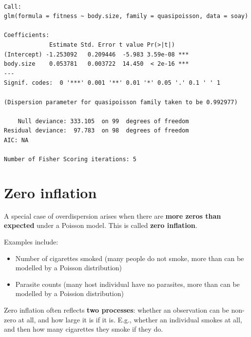 \documentclass[
  letterpaper,
  8pt,
  a4paper]{book}
\providecommand{\tightlist}{%
  \setlength{\itemsep}{0pt}\setlength{\parskip}{0pt}}
\begin{document}
\begin{verbatim}

Call:
glm(formula = fitness ~ body.size, family = quasipoisson, data = soay)

Coefficients:
             Estimate Std. Error t value Pr(>|t|)    
(Intercept) -1.253092   0.209446  -5.983 3.59e-08 ***
body.size    0.053781   0.003722  14.450  < 2e-16 ***
---
Signif. codes:  0 '***' 0.001 '**' 0.01 '*' 0.05 '.' 0.1 ' ' 1

(Dispersion parameter for quasipoisson family taken to be 0.992977)

    Null deviance: 333.105  on 99  degrees of freedom
Residual deviance:  97.783  on 98  degrees of freedom
AIC: NA

Number of Fisher Scoring iterations: 5
\end{verbatim}

\section*{Zero inflation}\label{zero-inflation}


A special case of overdispersion arises when there are \textbf{more
zeros than expected} under a Poisson model. This is called \textbf{zero
inflation}.

Examples include:

\begin{itemize}
\tightlist
\item
  Number of cigarettes smoked (many people do not smoke, more than can
  be modelled by a Poisson distribution)
\item
  Parasite counts (many host individual have no parasites, more than can
  be modelled by a Poission distribution)
\end{itemize}

\begin{tcolorbox}[enhanced jigsaw, arc=.35mm, bottomrule=.15mm, bottomtitle=1mm, breakable, colback=white, colbacktitle=quarto-callout-note-color!10!white, colframe=quarto-callout-note-color-frame, coltitle=black, left=2mm, leftrule=.75mm, opacityback=0, opacitybacktitle=0.6, rightrule=.15mm, title=\textcolor{quarto-callout-note-color}{\faInfo}\hspace{0.5em}{Note}, titlerule=0mm, toprule=.15mm, toptitle=1mm]

Zero inflation often reflects \textbf{two processes}: whether an
observation can be non-zero at all, and how large it is if it is. E.g.,
whether an individual smokes at all, and then how many cigarettes they
smoke if they do.

\end{tcolorbox}
\end{document}
